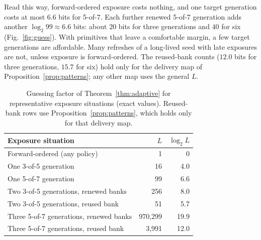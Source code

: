 \documentclass[pdflatex,sn-mathphys-num,twocolumn]{sn-jnl}
\theoremstyle{plain}
\theoremstyle{definition}
\begin{document}
Read this way, forward-ordered exposure costs nothing, and one target generation costs at most $6.6$ bits for 5-of-7. Each further renewed 5-of-7 generation adds another $\log_2 99\approx6.6$ bits: about $20$ bits for three generations and $40$ for six (Fig.~\ref{fig:guess}). With primitives that leave a comfortable margin, a few target generations are affordable. Many refreshes of a long-lived seed with late exposures are not, unless exposure is forward-ordered. The reused-bank counts ($12.0$ bits for three generations, $15.7$ for six) hold only for the delivery map of Proposition~\ref{prop:patterns}; any other map uses the general $L$.

\begin{table}[htbp]
\caption{Guessing factor of Theorem~\ref{thm:adaptive} for representative exposure situations (exact values). Reused-bank rows use Proposition~\ref{prop:patterns}, which holds only for that delivery map.}\label{tab:guess}
\centering\footnotesize
\begin{tabularx}{\linewidth}{@{}>{\raggedright\arraybackslash}Xrr@{}}\toprule
Exposure situation & $L$ & $\log_2L$\\\midrule
Forward-ordered (any policy) & 1 & 0\\
One 3-of-5 generation & 16 & 4.0\\
One 5-of-7 generation & 99 & 6.6\\
Two 3-of-5 generations, renewed banks & 256 & 8.0\\
Two 3-of-5 generations, reused bank & 51 & 5.7\\
Three 5-of-7 generations, renewed banks & 970,299 & 19.9\\
Three 5-of-7 generations, reused bank & 3,991 & 12.0\\\bottomrule
\end{tabularx}
\end{table}
\end{document}
